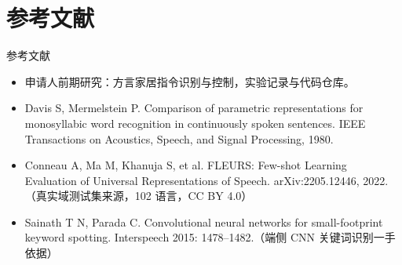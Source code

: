 \documentclass[10pt]{beamer}
\begin{document}
\section{参考文献}
\begin{frame}{参考文献}
    \begin{itemize}
        \item 申请人前期研究：方言家居指令识别与控制，实验记录与代码仓库。
        \item Davis S, Mermelstein P. Comparison of parametric representations for monosyllabic word recognition in continuously spoken sentences. IEEE Transactions on Acoustics, Speech, and Signal Processing, 1980.
        \item Conneau A, Ma M, Khanuja S, et al. FLEURS: Few-shot Learning Evaluation of
              Universal Representations of Speech. arXiv:2205.12446, 2022.
              （真实域测试集来源，102 语言，CC BY 4.0）
        \item Sainath T N, Parada C. Convolutional neural networks for small-footprint
              keyword spotting. Interspeech 2015: 1478--1482.（端侧 CNN 关键词识别一手依据）
    \end{itemize}
\end{frame}
\end{document}

